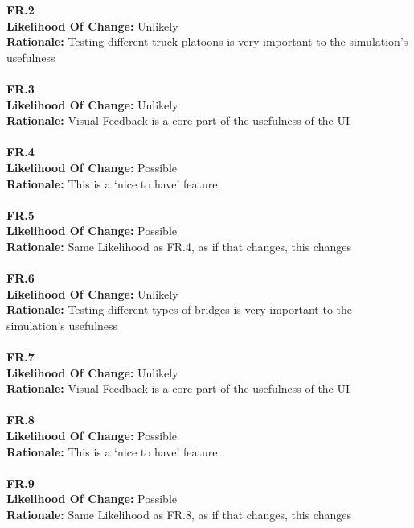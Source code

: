 \documentclass[12pt]{article}
\begin{document}
  \noindent \textbf{FR.2}\\  
  \textbf{Likelihood Of Change:} Unlikely\\ 
  \textbf{Rationale:} Testing different truck platoons is very important to the simulation's usefulness\\\\

  \noindent \textbf{FR.3}\\  
  \textbf{Likelihood Of Change:} Unlikely\\ 
  \textbf{Rationale:} Visual Feedback is a core part of the usefulness of the UI\\\\

  \noindent \textbf{FR.4}\\  
  \textbf{Likelihood Of Change:} Possible\\ 
  \textbf{Rationale:} This is a `nice to have' feature.\\\\

  \noindent \textbf{FR.5}\\  
  \textbf{Likelihood Of Change:} Possible\\ 
  \textbf{Rationale:} Same Likelihood as FR.4, as if that changes, this changes\\\\

  \noindent \textbf{FR.6}\\  
  \textbf{Likelihood Of Change:} Unlikely\\ 
  \textbf{Rationale:} Testing different types of bridges is very important to the simulation's usefulness\\\\

  \noindent \textbf{FR.7}\\  
  \textbf{Likelihood Of Change:} Unlikely\\ 
  \textbf{Rationale:} Visual Feedback is a core part of the usefulness of the UI\\\\

  \noindent \textbf{FR.8}\\  
  \textbf{Likelihood Of Change:} Possible\\ 
  \textbf{Rationale:} This is a `nice to have' feature.\\\\

  \noindent \textbf{FR.9}\\  
  \textbf{Likelihood Of Change:} Possible\\ 
  \textbf{Rationale:} Same Likelihood as FR.8, as if that changes, this changes\\\\
\end{document}
